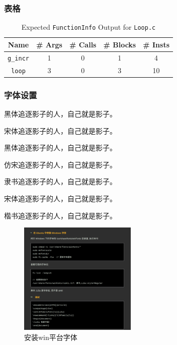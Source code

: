 \documentclass[11pt]{ctexart}
\newcommand{\lishu}{\CJKfamily{ls}}
\begin{document}
 
 \subsubsection{表格}
 
 \begin{table}[h]
 	\centering
 	\caption{Expected \texttt{FunctionInfo} Output for \texttt{Loop.c}}
 	\begin{tabular}{*{5}{c}}
 		\toprule
 		Name & \# Args & \# Calls & \# Blocks & \# Insts \\
 		\midrule
 		\texttt{g\_incr} & 1 & 0 & 1 &  4 \\
 		\texttt{loop}    & 3 & 0 & 3 & 10 \\
 		\bottomrule
 	\end{tabular}
 	\label{functioninfo-loop-mb}
 \end{table}
 
 \subsubsection{字体设置}
 
 {\heiti{} 黑体\qquad 追逐影子的人，自己就是影子。}
 
 {\songti{} 宋体\qquad 追逐影子的人，自己就是影子。}
 
    {\heiti{} 黑体\qquad 追逐影子的人，自己就是影子。}
 
 {\fangsong{} 仿宋\qquad 追逐影子的人，自己就是影子。}
 
 {\lishu{} 隶书\qquad 追逐影子的人，自己就是影子。}
 
  {\songti{} 宋体\qquad 追逐影子的人，自己就是影子。}
  
   {\kaishu{} 楷书\qquad 追逐影子的人，自己就是影子。}
   
   
   \begin{figure}[ht]
   	\centering
   	\includegraphics[width=0.5\textwidth]{images/font.png}
   	\caption{安装win平台字体}
   	\label{fig:setfont}
   \end{figure}
\end{document}
